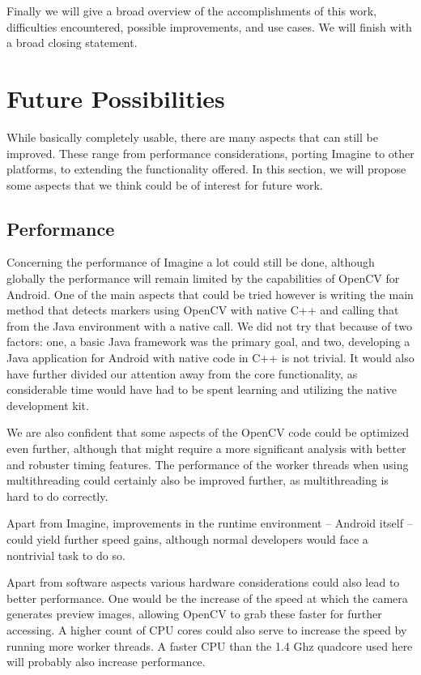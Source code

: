 Finally we will give a broad overview of the accomplishments of this work, difficulties encountered, possible improvements, and use cases.
We will finish with a broad closing statement.

\section{Future Possibilities}
\label{future}

While basically completely usable, there are many aspects that can still be improved.
These range from performance considerations, porting Imagine to other platforms, to extending the functionality offered.
In this section, we will propose some aspects that we think could be of interest for future work.

\subsection{Performance}

Concerning the performance of Imagine a lot could still be done, although globally the performance will remain limited by the capabilities of OpenCV for Android.
One of the main aspects that could be tried however is writing the main method that detects markers using OpenCV with native C++ and calling that from the Java environment with a native call.
We did not try that because of two factors: one, a basic Java framework was the primary goal, and two, developing a Java application for Android with native code in C++ is not trivial.
It would also have further divided our attention away from the core functionality, as considerable time would have had to be spent learning and utilizing the native development kit.

We are also confident that some aspects of the OpenCV code could be optimized even further, although that might require a more significant analysis with better and robuster timing features.
The performance of the worker threads when using multithreading could certainly also be improved further, as multithreading is hard to do correctly.

Apart from Imagine, improvements in the runtime environment – Android itself – could yield further speed gains, although normal developers would face a nontrivial task to do so.

Apart from software aspects various hardware considerations could also lead to better performance.
One would be the increase of the speed at which the camera generates preview images, allowing OpenCV to grab these faster for further accessing.
A higher count of CPU cores could also serve to increase the speed by running more worker threads.
A faster CPU than the 1.4 Ghz quadcore used here will probably also increase performance.

